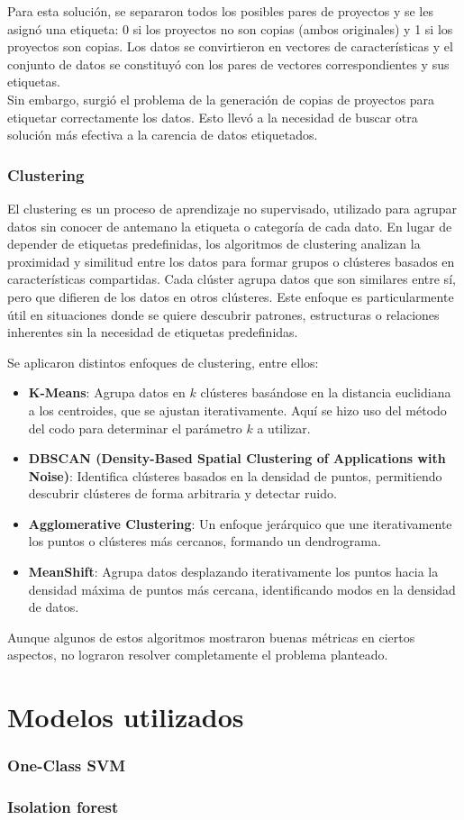 Para esta solución, se separaron todos los posibles pares de proyectos y se les asignó una etiqueta: 0 si los proyectos no son copias (ambos originales) y 1 si los proyectos son copias. Los datos se convirtieron en vectores de características y el conjunto de datos se constituyó con los pares de vectores correspondientes y sus etiquetas.\\

Sin embargo, surgió el problema de la generación de copias de proyectos para etiquetar correctamente los datos. Esto llevó a la necesidad de buscar otra solución más efectiva a la carencia de datos etiquetados.


\subsubsection{Clustering}

El clustering es un proceso de aprendizaje no supervisado, utilizado para agrupar datos sin conocer de antemano la etiqueta o categoría de cada dato. En lugar de depender de etiquetas predefinidas, los algoritmos de clustering analizan la proximidad y similitud entre los datos para formar grupos o clústeres basados en características compartidas. Cada clúster agrupa datos que son similares entre sí, pero que difieren de los datos en otros clústeres. Este enfoque es particularmente útil en situaciones donde se quiere descubrir patrones, estructuras o relaciones inherentes sin la necesidad de etiquetas predefinidas.

Se aplicaron distintos enfoques de clustering, entre ellos:
\begin{itemize}
    \item \textbf{K-Means}: Agrupa datos en \(k\) clústeres basándose en la distancia euclidiana a los centroides, que se ajustan iterativamente. Aquí se hizo uso del método del codo para determinar el parámetro \(k\) a utilizar.
    \item \textbf{DBSCAN (Density-Based Spatial Clustering of Applications with Noise)}: Identifica clústeres basados en la densidad de puntos, permitiendo descubrir clústeres de forma arbitraria y detectar ruido.
    \item \textbf{Agglomerative Clustering}: Un enfoque jerárquico que une iterativamente los puntos o clústeres más cercanos, formando un dendrograma.
    \item \textbf{MeanShift}: Agrupa datos desplazando iterativamente los puntos hacia la densidad máxima de puntos más cercana, identificando modos en la densidad de datos.
\end{itemize}

Aunque algunos de estos algoritmos mostraron buenas métricas en ciertos aspectos, no lograron resolver completamente el problema planteado. 

\section{Modelos utilizados}

\subsubsection{One-Class SVM}

\subsubsection{Isolation forest}


